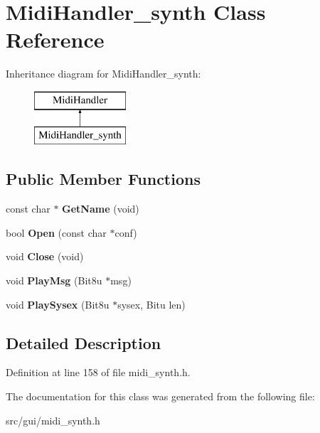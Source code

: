 \hypertarget{classMidiHandler__synth}{\section{Midi\-Handler\-\_\-synth Class Reference}
\label{classMidiHandler__synth}
}
Inheritance diagram for Midi\-Handler\-\_\-synth\-:\begin{figure}[H]
\begin{center}
\leavevmode
\includegraphics[height=2.000000cm]{classMidiHandler__synth}
\end{center}
\end{figure}
\subsection*{Public Member Functions}
\begin{DoxyCompactItemize}
\item 
\hypertarget{classMidiHandler__synth_a454a33652eaf4a99349caf378de56de0}{const char $\ast$ {\bfseries Get\-Name} (void)}\label{classMidiHandler__synth_a454a33652eaf4a99349caf378de56de0}

\item 
\hypertarget{classMidiHandler__synth_a026ce32cbfcb35586e6e6319a375f9ae}{bool {\bfseries Open} (const char $\ast$conf)}\label{classMidiHandler__synth_a026ce32cbfcb35586e6e6319a375f9ae}

\item 
\hypertarget{classMidiHandler__synth_ab73be86b44941f696b08a8eb2a4528e8}{void {\bfseries Close} (void)}\label{classMidiHandler__synth_ab73be86b44941f696b08a8eb2a4528e8}

\item 
\hypertarget{classMidiHandler__synth_afd4de648ae2becfbda22248e30856634}{void {\bfseries Play\-Msg} (Bit8u $\ast$msg)}\label{classMidiHandler__synth_afd4de648ae2becfbda22248e30856634}

\item 
\hypertarget{classMidiHandler__synth_a9f912eb5d21109f9b42c8a4b70d0544f}{void {\bfseries Play\-Sysex} (Bit8u $\ast$sysex, Bitu len)}\label{classMidiHandler__synth_a9f912eb5d21109f9b42c8a4b70d0544f}

\end{DoxyCompactItemize}


\subsection{Detailed Description}


Definition at line 158 of file midi\-\_\-synth.\-h.



The documentation for this class was generated from the following file\-:\begin{DoxyCompactItemize}
\item 
src/gui/midi\-\_\-synth.\-h\end{DoxyCompactItemize}
